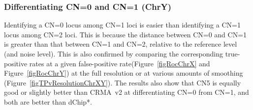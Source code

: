 \documentclass{bioinfo}
\newcommand{\TPrates}{true-positive rates\xspace}
\newcommand{\FPrate}{false-positive rate\xspace}
\begin{document}
\subsubsection{Differentiating CN=0 and CN=1 (ChrY)}
Identifying a CN=0 locus among CN=1 loci is easier than identifying a CN=1 locus among CN=2 loci.  
This is because the distance between CN=0 and CN=1 is greater than that between CN=1 and CN=2, relative to the reference level (and noise level). 
This is also confirmed by comparing the corresponding \TPrates at a given \FPrate (Figure~\ref{figRocChrX} and Figure~\ref{figRocChrY}) at the full resolution or at various amounts of smoothing (Figure~\ref{figTPvResolutionChrXY}).  
The results also show that CN5 is equally good or slightly better than CRMA~v2 at differentiating CN=0 from CN=1, and both are better than dChip*.
\end{document}
